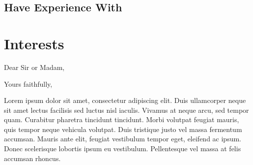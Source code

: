 \documentclass[11pt,a4paper,sans]{moderncv}        %
\begin{document}
\subsection{Have Experience With}

\section{Interests}

\nocite{*}



\clearpage
\date{January 01, 1984}
\opening{Dear Sir or Madam,}
\closing{Yours faithfully,}
\makelettertitle

Lorem ipsum dolor sit amet, consectetur adipiscing elit. Duis ullamcorper neque sit amet lectus facilisis sed luctus nisl iaculis. Vivamus at neque arcu, sed tempor quam. Curabitur pharetra tincidunt tincidunt. Morbi volutpat feugiat mauris, quis tempor neque vehicula volutpat. Duis tristique justo vel massa fermentum accumsan. Mauris ante elit, feugiat vestibulum tempor eget, eleifend ac ipsum. Donec scelerisque lobortis ipsum eu vestibulum. Pellentesque vel massa at felis accumsan rhoncus.
\end{document}
